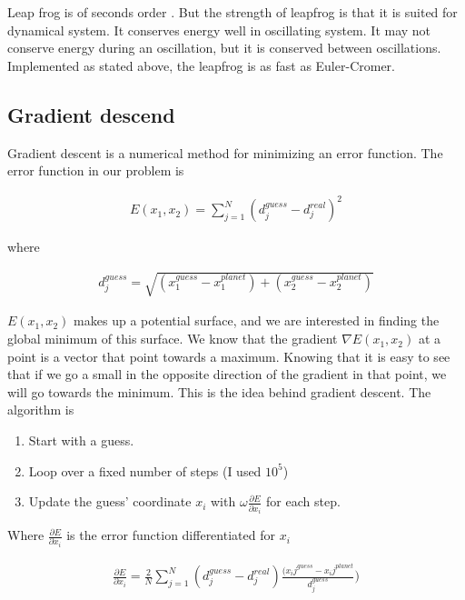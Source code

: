 \documentclass[a4paper, 10pt]{article}
\begin{document}
Leap frog is of seconds order \cite{leap2}. But the strength of leapfrog is that it is suited for dynamical system. It conserves energy well in oscillating system. It may not conserve energy during an oscillation, but it is conserved between oscillations. \\

Implemented as stated above, the leapfrog is as fast as Euler-Cromer. 
\subsection{Gradient descend}\label{sec:gradient}

Gradient descent is a numerical method for minimizing an error function. The error function in our problem is

\begin{align}
E(x_1,x_2) = \sum_{j=1}^N(d_j^{guess} - d_j^{real})^2
\end{align} 

where 

\begin{align}
d_j^{guess} = \sqrt{(x_1^{guess}-x_1^{planet}) + (x_2^{guess}-x_2^{planet})}
\end{align}

$E(x_1,x_2)$ makes up a potential surface, and we are interested in finding the global minimum of this surface. We know that the gradient $\nabla E(x_1,x_2)$ at a point is a vector that point towards a maximum. Knowing that it is easy to see that if we go a small in the opposite direction of the gradient in that point, we will go towards the minimum. This is the idea behind gradient descent. The algorithm is

\begin{enumerate}
\item Start with a guess.
\item Loop over a fixed number of steps (I used $10^{5}$)
\item Update the guess' coordinate $x_i$ with $\omega \frac{\partial E}{\partial x_i}$ for each step.
\end{enumerate}

Where $\frac{\partial E}{\partial x_i}$ is the error function differentiated for $x_i$

\begin{align}\label{eq:gradient}
\frac{\partial E}{\partial x_i} = \frac{2}{N}\sum_{j=1}^N (d_j^{guess} - d_j^{real})\frac{(x_ij^{guess} - x_ij^{planet}}{d_j^{guess}})
\end{align}
\end{document}
